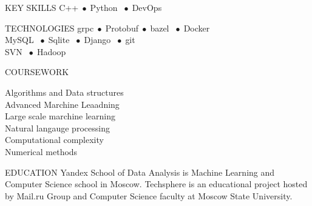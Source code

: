 \documentclass[12pt]{cutecv}
\author{Svyatoslav Feldsherov}
\newcommand{\listbullet}{\small$\; \bullet \;$}
\begin{document}
\maketitle

\begin{paracol}{2}
\setlength{\columnsep}{2em}

\begin{leftcolumn}
\begin{cvsection}{KEY SKILLS}
   C++\listbullet Python \listbullet DevOps
\end{cvsection}

\begin{cvsection}{TECHNOLOGIES}
  grpc\listbullet Protobuf\listbullet bazel \listbullet Docker \\
  MySQL \listbullet Sqlite \listbullet Django \listbullet git \\
  SVN \listbullet Hadoop \\
\end{cvsection}

\begin{cvsection}{COURSEWORK}

  {\HLight
    Algorithms and Data structures\\
    Advanced Marchine Leaadning\\
    Large scale marchine learning\\
    Natural langauge processing\\
    Computational complexity\\
    Numerical methods\\
  }
\end{cvsection}

\begin{cvsection}{EDUCATION}
    {Yandex School of Data Analysis is Machine Learning
     and Computer Science school in Moscow.}
   {Techsphere is an educational project hosted
    by Mail.ru Group and Computer Science faculty
    at Moscow State University.}
\end{cvsection}
\end{leftcolumn}


\end{paracol}
\end{document}
